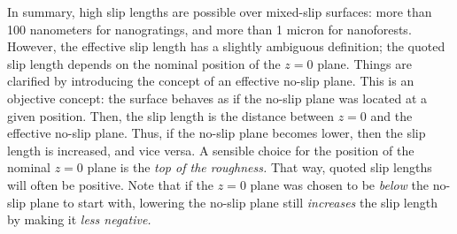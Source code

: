\documentclass[12pt, a4paper, twoside, openright]{book}
\begin{document}
In summary, high slip lengths are possible over mixed-slip surfaces: more than 100 nanometers for nanogratings, and more than 1 micron for nanoforests.  However, the effective slip length has a slightly ambiguous definition; the quoted slip length depends on the nominal position of the $z=0$ plane.  Things are clarified by introducing the concept of an effective no-slip plane.  This is an objective concept: the surface behaves as if the no-slip plane was located at a given position.  Then, the slip length is the distance between $z=0$ and the effective no-slip plane.  Thus, if the no-slip plane becomes lower, then the slip length is increased, and vice versa.  A sensible choice for the position of the nominal $z=0$ plane is the \emph{top of the roughness.}  That way, quoted slip lengths will often be positive.  Note that if the $z=0$ plane was chosen to be \emph{below} the no-slip plane to start with, lowering the no-slip plane still \emph{increases} the slip length by making it \emph{less negative.}




\end{document}
